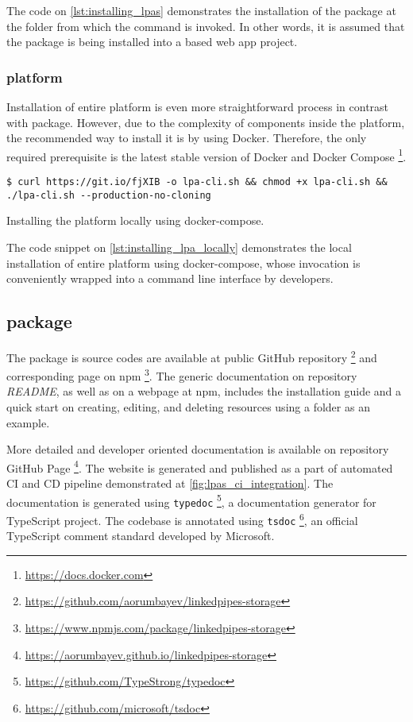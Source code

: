 The code on \autoref{lst:installing_lpas} demonstrates the installation of the package at the folder from which the command is invoked. In other words, it is assumed that the package is being installed into a \solid{} based web app project. 

\subsubsection{\lpa{} platform}

Installation of entire \lpa{} platform is even more straightforward process in contrast with \lpas{} package. However, due to the complexity of components inside the platform, the recommended way to install it is by using Docker. Therefore, the only required prerequisite is the latest stable version of Docker and Docker Compose \footnote{\url{https://docs.docker.com}}. 

\begin{listing}[H]    
\begin{verbatim}
$ curl https://git.io/fjXIB -o lpa-cli.sh && chmod +x lpa-cli.sh && ./lpa-cli.sh --production-no-cloning
\end{verbatim}
\caption{Installing the \lpa{} platform locally using docker-compose.} 
\label{lst:installing_lpa_locally}
\end{listing}

The code snippet on \autoref{lst:installing_lpa_locally} demonstrates the local installation of entire \lpa{} platform using docker-compose, whose invocation is conveniently wrapped into a command line interface by \lpa{} developers.

\subsection{\lpas{} package}

The package is source codes are available at public GitHub repository \footnote{\url{https://github.com/aorumbayev/linkedpipes-storage}} and corresponding page on npm \footnote{\url{https://www.npmjs.com/package/linkedpipes-storage}}. The generic documentation on repository \textit{README}, as well as on a webpage at npm, includes the installation guide and a quick start on creating, editing, and deleting resources using a folder as an example. 

More detailed and developer oriented documentation is available on repository GitHub Page \footnote{\url{https://aorumbayev.github.io/linkedpipes-storage}}. The website is generated and published as a part of automated CI and CD pipeline demonstrated at \autoref{fig:lpas_ci_integration}. The documentation is generated using \texttt{typedoc} \footnote{\url{https://github.com/TypeStrong/typedoc}}, a documentation generator for TypeScript project. The codebase is annotated using \texttt{tsdoc} \footnote{\url{https://github.com/microsoft/tsdoc}}, an official TypeScript comment standard developed by Microsoft.

